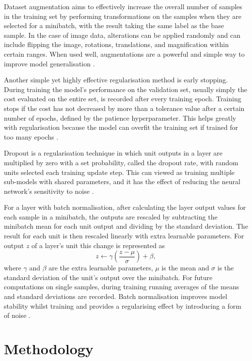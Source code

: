 \documentclass[12pt]{article}
\begin{document}
Dataset augmentation aims to effectively increase the overall number of samples in the training set by performing transformations on the samples when they are selected for a minibatch, with the result taking the same label as the base sample. In the case of image data, alterations can be applied randomly and can include flipping the image, rotations, translations, and magnification within certain ranges. When used well, augmentations are a powerful and simple way to improve model generalisation \cite{Goodfellow16}.

Another simple yet highly effective regularisation method is early stopping. During training the model's performance on the validation set, usually simply the cost evaluated on the entire set, is recorded after every training epoch. Training stops if the cost has not decreased by more than a tolerance value after a certain number of epochs, defined by the patience hyperparameter. This helps greatly with regularisation because the model can overfit the training set if trained for too many epochs \cite{Goodfellow16, Bishop95}.

Dropout is a regularisation technique in which unit outputs in a layer are multiplied by zero with a set probability, called the dropout rate, with random units selected each training update step. This can viewed as training multiple sub-models with shared parameters, and it has the effect of reducing the neural network's sensitivity to noise \cite{Srivastava2014}.

For a layer with batch normalisation, after calculating the layer output values for each sample in a minibatch, the outputs are rescaled by subtracting the minibatch mean for each unit output and dividing by the standard deviation. The result for each unit is then rescaled linearly with extra learnable parameters. For output $z$ of a layer's unit this change is represented as
\begin{equation}
z\leftarrow\gamma\left(\frac{z-\mu}{\sigma}\right)+\beta, \label{batchnorm}
\end{equation}
where $\gamma$ and $\beta$ are the extra learnable parameters, $\mu$ is the mean and $\sigma$ is the standard deviation of the unit's output over the minibatch. For future computations on single samples, during training running averages of the means and standard deviations are recorded. Batch normalisation improves model stability whilst training and provides a regularising effect by introducing a form of noise \cite{Ioffe15}.

\section{Methodology}
\end{document}

